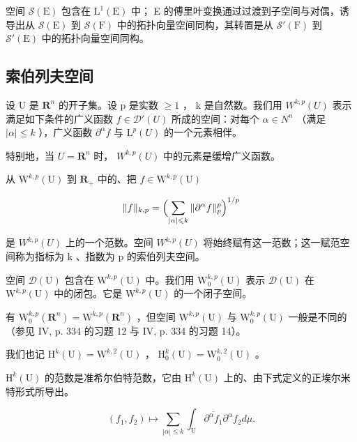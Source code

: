空间 \(\mathcal{S}(\mathrm{E})\) 包含在 \(\mathrm{L}^1 (\mathrm{E})\) 中； E 的傅里叶变换通过过渡到子空间与对偶，诱导出从 \(\mathcal{S}(\mathrm{E})\) 到 \(\mathcal{S}(\mathrm{F})\) 中的拓扑向量空间同构，其转置是从 \(\mathcal{S}'(\mathrm{F})\) 到 \(\mathcal{S}'(\mathrm{E})\) 中的拓扑向量空间同构。

\subsection{索伯列夫空间}

设 U 是 \(\mathbf{R}^{n} \) 的开子集。设 p 是实数 \(\geqslant 1\) ， k 是自然数。我们用 \(W^{k,p}(U)\) 表示满足如下条件的广义函数 \(f \in \mathcal{D}'(U)\) 所成的空间：对每个 \(\alpha \in N^{n}\) （满足 \(|\alpha| \leqslant k\) ），广义函数 \(\partial^{\alpha}f\) 与 \(\mathrm{L}^{p}(U) \) 的一个元素相伴。

特别地，当 \(U = \mathbf{R}^{n}\) 时， \(W^{k,p}(U)\) 中的元素是缓增广义函数。

从 \(\mathrm{W}^{k,p}(\mathrm{U})\) 到 \(\mathbf{R}_{+}\) 中的、把 \(f\in \mathrm{W}^{k,p}(\mathrm{U})\)

\[
\| f \| _ {k, p} = \Bigl (\sum_ {| \alpha | \leqslant k} \| \partial^ {\alpha} f \| _ {p} ^ {p} \Bigr) ^ {1 / p}
\]

是 \(W^{k,p}(U)\) 上的一个范数。空间 \(W^{k,p}(U)\) 将始终赋有这一范数；这一赋范空间称为指标为 k 、指数为 p 的索伯列夫空间。

空间 \(\mathcal{D}(\mathrm{U})\) 包含在 \(\mathrm{W}^{k,p}(\mathrm{U})\) 中。我们用 \(\mathrm{W}_0^{k,p}(\mathrm{U})\) 表示 \(\mathcal{D}(\mathrm{U})\) 在 \(\mathrm{W}^{k,p}(\mathrm{U})\) 中的闭包。它是 \(\mathrm{W}^{k,p}(\mathrm{U})\) 的一个闭子空间。

有 \(\mathrm{W}_{0}^{k,p}(\mathbf{R}^{n})=\mathrm{W}^{k,p}(\mathbf{R}^{n})\) ，但空间 \(\mathrm{W}^{k,p}(\mathrm{U})\) 与 \(\mathrm{W}_{0}^{k,p}(\mathrm{U})\) 一般是不同的（参见 IV, p. 334 的习题 12 与 IV, p. 334 的习题 14）。

我们也记 \(\mathrm{H}^k (\mathrm{U}) = \mathrm{W}^{k,2}(\mathrm{U})\) ， \(\mathrm{H}_0^k (\mathrm{U}) = \mathrm{W}_0^{k,2}(\mathrm{U})\) 。

 \(\mathrm{H}^{k}(\mathrm{U})\) 的范数是准希尔伯特范数，它由 \(\mathrm{H}^{k}(\mathrm{U})\) 上的、由下式定义的正埃尔米特形式所导出。

\[
\left(f _ {1}, f _ {2}\right) \mapsto \sum_ {| \alpha | \leqslant k} \int_ {\mathrm{U}} \overline {{\partial^ {\alpha} f _ {1}}} \partial^ {\alpha} f _ {2} d \mu .
\]

